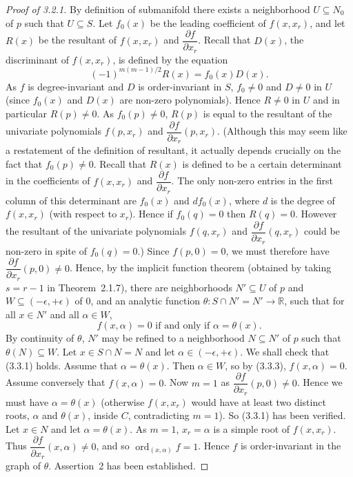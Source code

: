 \documentclass[11pt]{article}
\theoremstyle{plain}
\theoremstyle{definition}
\newcommand{\R}{\mathbb{R}}
\DeclareMathOperator{\ord}{ord}
\begin{document}
\begin{proof}[Proof of 3.2.1]
By definition of submanifold there exists a neighborhood
$U \subseteq N_0$ of $p$ such that $U \subseteq S$. Let $f_0(x)$ be the
leading coefficient of $f(x, x_r)$, and let $R(x)$ be the resultant of
$f(x, x_r)$ and $\dfrac{\partial f}{\partial x_r}$. Recall that $D(x)$,
the discriminant of $f(x, x_r)$, is defined by the equation
\[
(-1)^{m(m-1)/2} R(x) = f_0(x) D(x).
\]
As $f$ is degree-invariant and $D$ is order-invariant in $S$,
$f_0 \ne 0$ and $D \ne 0$ in $U$ (since $f_0(x)$ and $D(x)$ are
non-zero polynomials). Hence $R \ne 0$ in $U$ and in particular
$R(p) \ne 0$. As $f_0(p) \ne 0$, $R(p)$ is equal to the resultant of
the univariate polynomials $f(p, x_r)$ and
$\dfrac{\partial f}{\partial x_r}(p, x_r)$. (Although this may seem
like a restatement of the definition of resultant, it actually depends
crucially on the fact that $f_0(p) \ne 0$. Recall that $R(x)$ is
defined to be a certain determinant in the coefficients of $f(x, x_r)$
and $\dfrac{\partial f}{\partial x_r}$. The only non-zero entries in
the first column of this determinant are $f_0(x)$ and $d f_0(x)$,
where $d$ is the degree of $f(x, x_r)$ (with respect to $x_r$). Hence
if $f_0(q) = 0$ then $R(q) = 0$. However the resultant of the
univariate polynomials $f(q, x_r)$ and $\dfrac{\partial f}{\partial x_r}
(q, x_r)$ could be non-zero in spite of $f_0(q) = 0$.) Since
$f(p, 0) = 0$, we must therefore have
$\dfrac{\partial f}{\partial x_r}(p, 0) \ne 0$. Hence, by the implicit
function theorem (obtained by taking $s = r-1$ in Theorem~2.1.7),
there are neighborhoods $N' \subseteq U$ of $p$ and
$W \subseteq (-\epsilon, +\epsilon)$ of $0$, and an analytic function
$\theta : S \cap N' = N' \to \R$, such that for all $x \in N'$ and all
$\alpha \in W$,
\begin{equation}
f(x, \alpha) = 0 \text{ if and only if } \alpha = \theta(x). \tag{3.3.3}
\end{equation}
By continuity of $\theta$, $N'$ may be refined to a neighborhood
$N \subseteq N'$ of $p$ such that $\theta(N) \subseteq W$. Let
$x \in S \cap N = N$ and let $\alpha \in (-\epsilon, +\epsilon)$. We
shall check that (3.3.1) holds. Assume that $\alpha = \theta(x)$.
Then $\alpha \in W$, so by (3.3.3), $f(x, \alpha) = 0$. Assume
conversely that $f(x, \alpha) = 0$. Now $m = 1$ as
$\dfrac{\partial f}{\partial x_r}(p, 0) \ne 0$. Hence we must have
$\alpha = \theta(x)$ (otherwise $f(x, x_r)$ would have at least two
distinct roots, $\alpha$ and $\theta(x)$, inside $C$, contradicting
$m = 1$). So (3.3.1) has been verified. Let $x \in N$ and let
$\alpha = \theta(x)$. As $m = 1$, $x_r = \alpha$ is a simple root of
$f(x, x_r)$. Thus $\dfrac{\partial f}{\partial x_r}(x, \alpha) \ne 0$,
and so $\ord_{(x, \alpha)} f = 1$. Hence $f$ is order-invariant in the
graph of $\theta$. Assertion~2 has been established.


\end{proof}
\end{document}
